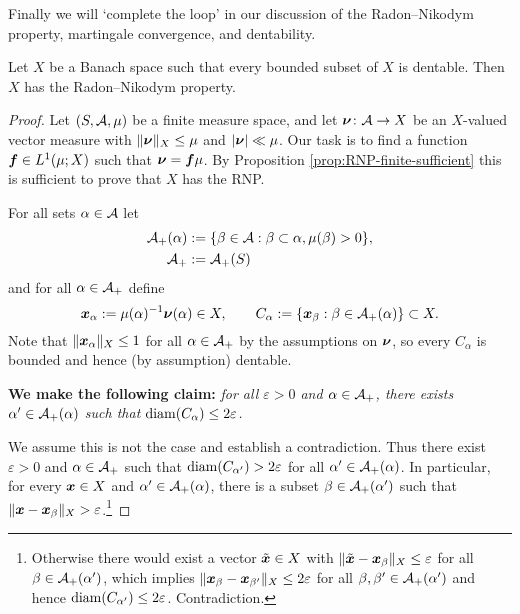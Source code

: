 Finally we will `complete the loop' in our discussion of the Radon--Nikodym property, martingale convergence, and dentability.

\begin{thm}\label{thm:dent-RNP}
  Let $X$ be a Banach space such that every bounded subset of $X$ is dentable.
  Then $X$ has the Radon--Nikodym property.
\end{thm}

\begin{proof}
  Let $(S,\mathcal{A},\mu)$ be a finite measure space, and let $\bm{\nu} \colon \mathcal{A} \rightarrow X$ be an $X$-valued vector measure with $\|\bm{\nu}\|_{X} \leq \mu$ and $|\bm{\nu}| \ll \mu$.
  Our task is to find a function $\bm{f} \in L^1(\mu;X)$ such that $\bm{\nu} = \bm{f}\mu$.
  By Proposition \ref{prop:RNP-finite-sufficient} this is sufficient to prove that $X$ has the RNP.

  For all sets $\alpha \in \mathcal{A}$ let
  \begin{equation*}
    \begin{aligned}
      \mathcal{A}_{+}(\alpha) &:= \{\beta \in \mathcal{A} : \beta \subset \alpha, \mu(\beta) > 0\}, \\
      \mathcal{A}_{+} &:= \mathcal{A}_{+}(S)
    \end{aligned}
  \end{equation*}
  and for all $\alpha \in \mathcal{A}_{+}$ define
  \begin{equation*}
    \bm{x}_{\alpha} := \mu(\alpha)^{-1} \bm{\nu}(\alpha)\in X, \qquad 
    C_{\alpha} := \{ \bm{x}_{\beta} : \beta \in \mathcal{A}_{+}(\alpha)\} \subset X.
  \end{equation*}
  Note that $\|\bm{x}_{\alpha}\|_X \leq 1$ for all $\alpha \in \mathcal{A}_{+}$ by the assumptions on $\bm{\nu}$, so every $C_{\alpha}$ is bounded and hence (by assumption) dentable.

  \textbf{We make the following claim:} \emph{for all $\varepsilon > 0$ and $\alpha \in \mathcal{A}_{+}$, there exists $\alpha' \in \mathcal{A}_+(\alpha)$ such that $\operatorname{diam}(C_{\alpha}) \leq 2\varepsilon$.}
  
  We assume this is not the case and establish a contradiction.
  Thus there exist $\varepsilon > 0$ and $\alpha \in \mathcal{A}_{+}$ such that $\operatorname{diam}(C_{\alpha'}) > 2\varepsilon$ for all $\alpha' \in \mathcal{A}_+(\alpha)$.
  In particular, for every $\bm{x} \in X$ and $\alpha' \in \mathcal{A}_{+}(\alpha)$, there is a subset $\beta \in \mathcal{A}_{+}(\alpha')$ such that $\|\bm{x} - \bm{x}_{\beta}\|_{X} > \varepsilon$.\footnote{Otherwise there would exist a vector $\tilde{\bm{x}} \in X$ with $\|\tilde{\bm{x}} - \bm{x}_{\beta}\|_{X} \leq \varepsilon$ for all $\beta \in \mathcal{A}_{+}(\alpha')$, which implies $\|\bm{x}_{\beta} - \bm{x}_{\beta'}\|_{X} \leq 2\varepsilon$ for all $\beta,\beta' \in \mathcal{A}_+(\alpha')$ and hence $\operatorname{diam}(C_{\alpha'}) \leq 2\varepsilon$. Contradiction.}
  

\end{proof}
